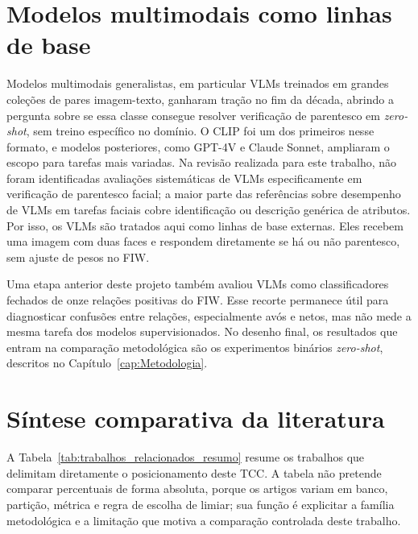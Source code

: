 \section{Modelos multimodais como linhas de base}

Modelos multimodais generalistas, em particular VLMs treinados em grandes coleções de pares imagem-texto, ganharam tração no fim da década, abrindo a pergunta sobre se essa classe consegue resolver verificação de parentesco em \textit{zero-shot}, sem treino específico no domínio. O CLIP \cite{radford2021learning}
foi um dos primeiros nesse formato, e modelos posteriores, como GPT-4V e Claude Sonnet, ampliaram o escopo para tarefas mais variadas. Na revisão realizada para este trabalho, não foram identificadas avaliações sistemáticas de VLMs especificamente em verificação de parentesco facial; a maior parte das referências sobre desempenho de VLMs em tarefas faciais cobre identificação ou descrição genérica de atributos. Por isso, os VLMs são tratados aqui como linhas de base externas. Eles recebem uma imagem com duas faces e respondem diretamente se há ou não parentesco, sem ajuste de pesos no FIW.

Uma etapa anterior deste projeto também avaliou VLMs como classificadores fechados de onze relações positivas do FIW. Esse recorte permanece útil para diagnosticar confusões entre relações, especialmente avós e netos, mas não mede a mesma tarefa dos modelos supervisionados. No desenho final, os resultados que entram na comparação metodológica são os experimentos binários \textit{zero-shot}, descritos no Capítulo~\ref{cap:Metodologia}.

\section{Síntese comparativa da literatura}

A Tabela~\ref{tab:trabalhos_relacionados_resumo} resume os trabalhos que delimitam diretamente o posicionamento deste TCC. A tabela não pretende comparar percentuais de forma absoluta, porque os artigos variam em banco, partição, métrica e regra de escolha de limiar; sua função é explicitar a família metodológica e a limitação que motiva a comparação controlada deste trabalho.

